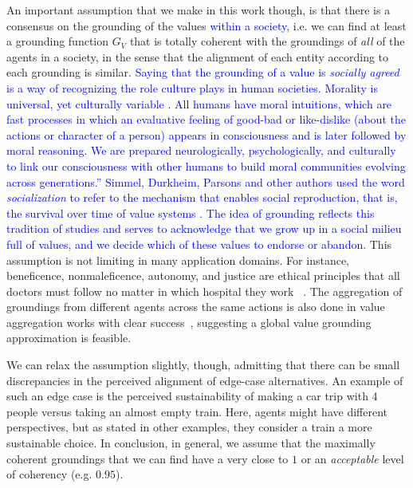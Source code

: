 \documentclass{ecai}
\begin{document}


An important assumption that we make in this work though, is that there is a consensus on the grounding of the values \textcolor{blue}{within a society}, i.e. we can find at least a grounding function $G_V$ that is totally coherent with the groundings of \textit{all} of the agents in a society, in the sense that the alignment of each entity according to each grounding is similar. \textcolor{blue}{Saying that the grounding of a value is \textit{socially agreed} \cite{andres2024vecompPaper} is a way of recognizing the role culture plays in human societies. Morality is universal, yet culturally variable \cite{haidt2007new}. All humans have moral intuitions, which are fast processes in which an evaluative feeling of good-bad or like-dislike (about the actions or character of a person) appears in consciousness and is later followed by moral reasoning. We are prepared neurologically, psychologically, and culturally to link our consciousness with other humans to build moral communities evolving across generations.” }
\textcolor{blue}{Simmel, Durkheim, Parsons and other authors used the word \emph{socialization} to refer to the mechanism that enables social reproduction, that is, the survival over time of value systems \cite{guhin2021whatever}. The idea of grounding reflects this tradition of studies and serves to acknowledge that we grow up in a social milieu full of values, and we decide which of these values to endorse or abandon.} This assumption is not limiting in many application domains. For instance, beneficence, nonmaleficence, autonomy, and justice are ethical principles that all doctors must follow no matter in which hospital they work %
~\cite{clinicalValues2020}. The aggregation of groundings from different agents across the same actions is also done in value aggregation works with clear success~\cite{leraleri2024aggregation,AaronAgreementTOPSIS}, suggesting a global value grounding approximation is feasible.

We can relax the assumption slightly, though, admitting that there can be small discrepancies in the perceived alignment of edge-case alternatives. An example of such an edge case is the perceived sustainability of making a car trip with 4 people versus taking an almost empty train. Here, agents might have different perspectives, but as stated in other examples, they consider a train a more sustainable choice. In conclusion, in general, we assume that the maximally coherent groundings that we can find have a very close to $1$ or an \textit{acceptable} level of coherency (e.g. $0.95$).
\end{document}
